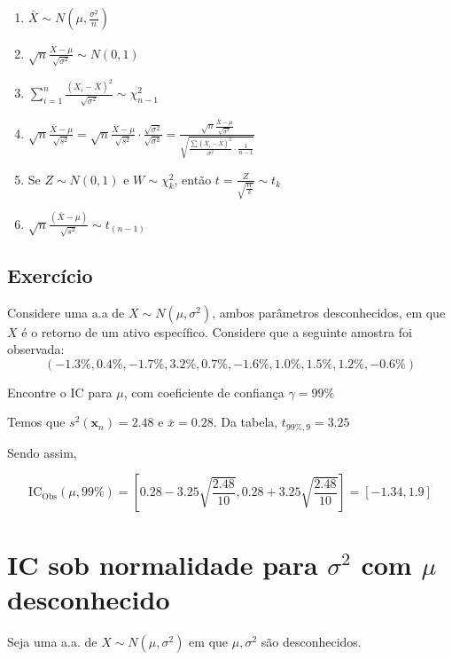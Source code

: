 \documentclass[
  letterpaper,
  DIV=11,
  numbers=noendperiod]{scrreprt}
\providecommand{\tightlist}{%
  \setlength{\itemsep}{0pt}\setlength{\parskip}{0pt}}\usepackage{longtable,booktabs,array}
\begin{document}
\begin{enumerate}
\def\labelenumi{\arabic{enumi}.}
\tightlist
\item
  \(\bar{X} \sim N (\mu, \frac{\sigma^2}{n})\)
\item
  \(\sqrt{n}\frac{\bar{X} - \mu}{\sqrt{\sigma^2}}\sim N(0,1)\)
\item
  \(\sum\limits^{n}_{i=1}\frac{(X_{i} - \bar{X})^2}{\sqrt{\sigma^2}} \sim \chi^2_{n-1}\)
\item
  \(\sqrt{n}\frac{\bar{X} - \mu}{\sqrt{s^2}} = \sqrt{n}\frac{\bar{X} - \mu}{\sqrt{s^2}} \cdot
  \frac{\sqrt{\sigma^2}}{\sqrt{\sigma^2}}  = \frac{\sqrt{n}\frac{\bar{X} - \mu}{\sqrt{\sigma^2}}}
  {\sqrt{\frac{\sum(X_i - \bar{X})^2}{\sigma^2} \cdot \frac{1}{n-1}}}\)
\item
  Se \(Z \sim N(0,1)\) e \(W \sim \chi^{2}_{k}\), então
  \(t = \frac{Z}{\sqrt{\frac{W}{k}}} \sim t_{k}\)
\item
  \(\sqrt{n} \frac{(\bar{X} - \mu)}{\sqrt{s^2}} \sim t_{(n-1)}\)
\end{enumerate}

\subsection{Exercício}\label{exercuxedcio}

Considere uma a.a de \(X\sim N(\mu, \sigma^2)\), ambos parâmetros
desconhecidos, em que \(X\) é o retorno de um ativo específico.
Considere que a seguinte amostra foi observada: \[
(-1.3\%, 0.4\%, -1.7\%, 3.2\%, 0.7\%, -1.6\%, 1.0\%, 1.5\%, 1.2\%, -0.6\%)
\]

Encontre o IC para \(\mu\), com coeficiente de confiança
\(\gamma = 99\%\)

Temos que \(s^2(\pmb{x}_{n}) = 2.48\) e \(\bar{x} = 0.28\). Da tabela,
\(t_{99\%, 9} = 3.25\)

Sendo assim,

\[
\mathrm{IC}_{\mathrm{Obs}}(\mu,99\%) = \left[0.28 - 3.25 \sqrt{\frac{2.48}{10}}, 0.28 + 3.25\sqrt{\frac{2.48}{10}}\right] = [-1.34, 1.9]
\]

\section{\texorpdfstring{IC sob normalidade para \(\sigma^2\) com
\(\mu\)
desconhecido}{IC sob normalidade para \textbackslash sigma\^{}2 com \textbackslash mu desconhecido}}\label{ic-sob-normalidade-para-sigma2-com-mu-desconhecido}

Seja uma a.a. de \(X \sim N(\mu, \sigma^2)\) em que \(\mu, \sigma^2\)
são desconhecidos.
\end{document}
